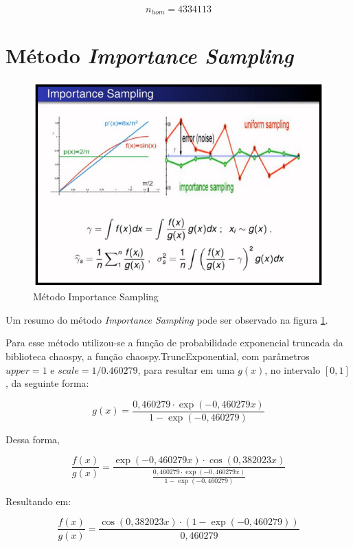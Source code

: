 \documentclass{article}
\begin{document}
\[
    n_{hom} = 4334113
\]


\section{Método \textit{Importance Sampling}}

\begin{figure}[H]
    \centering
    \includegraphics[width=.7\linewidth]{Imagens/MC_ImportanceSampling.png}
    \caption{Método Importance Sampling}
    \label{fig:ImpSam}
\end{figure}

Um resumo do método \textit{Importance Sampling} pode ser observado na figura \ref{fig:ImpSam}.\newline  

Para esse método utilizou-se a função de probabilidade exponencial truncada da biblioteca chaospy\cite{FEINBERG201546}, a função chaospy.TruncExponential, com parâmetros $upper = 1$ e $scale = 1/0.460279$, para resultar em uma $g(x)$, no intervalo $[0,1]$, da seguinte forma:

\begin{equation*}
    g(x) = \frac{0,460279\cdot \exp(-0,460279x)}{1-\exp(-0,460279)}
\end{equation*}

Dessa forma,

\begin{equation*}
    \frac{f(x)}{g(x)}=\frac{\exp(-0,460279x)\cdot\cos(0,382023x)}{\frac{0,460279\cdot \exp(-0,460279x)}{1-\exp(-0,460279)}}
\end{equation*}

Resultando em:

\begin{equation}
    \frac{f(x)}{g(x)} = \frac{\cos(0,382023x)\cdot(1-\exp(-0,460279))}{0,460279}
    \label{eqn:FsobreG}
\end{equation}
\end{document}
